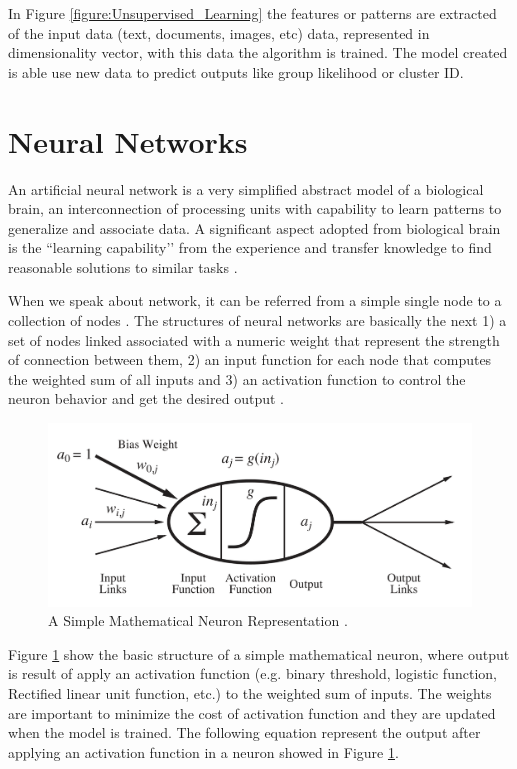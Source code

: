 \documentclass[12pt]{report}
\begin{document}
In Figure \ref{figure:Unsupervised_Learning} the features or patterns are extracted of the input data (text, documents, images, etc) data, represented in dimensionality vector, with this data the algorithm is trained. The model created is able use new data to predict outputs like group likelihood or cluster ID.

\section{Neural Networks}
An artificial neural network is a very simplified abstract model of a biological brain, an interconnection of processing units with capability to learn patterns to generalize and associate data. A significant aspect adopted from biological brain is the ``learning capability’’ from the experience and transfer knowledge to find reasonable solutions to similar tasks \cite{ Gurney2004} \cite{ Kriesel2005}.

When we speak about network, it can be referred from a simple single node to a collection of nodes \cite{ Kriesel2005}. The structures of neural networks are basically the next 1) a set of nodes linked associated with a numeric weight that represent the strength of connection between them, 2) an input function for each node that computes the weighted sum of all inputs and 3) an activation function to control the neuron behavior and get the desired output \cite{ Kriesel2005} \cite{Russell2010}. 

\begin{figure}[H]	
	\centering
	\includegraphics[width=160mm, scale = 1]{images/3_neuron.png}	
	\caption{A Simple Mathematical Neuron Representation \cite{Russell2010}.}	
	\label{figure:Mathematical_Neuron}
\end{figure}

Figure \ref{figure:Mathematical_Neuron} show the basic structure of a simple mathematical neuron, where output is result of apply an activation function (e.g. binary threshold, logistic function, Rectified linear unit function, etc.) to the weighted sum of inputs. The weights are important to minimize the cost of activation function and they are updated when the model is trained. The following equation represent the output after applying an activation function in a neuron showed in Figure \ref{figure:Mathematical_Neuron}.
\end{document}
